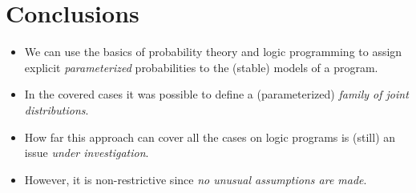 \documentclass{beamer}
\begin{document}
\section{Conclusions}
\begin{frame}
    \begin{itemize}
        \item We can use the basics of probability theory and logic programming to assign explicit \emph{parameterized} probabilities to the (stable) models of a program.
        \item In the covered cases it was possible to define a (parameterized) \emph{family of joint distributions}.
        \item How far this approach can cover all the cases on logic programs is (still) an issue \emph{under investigation}.
        \item However, it is non-restrictive since \emph{no unusual assumptions are made}.
    \end{itemize}
\end{frame}
\end{document}
